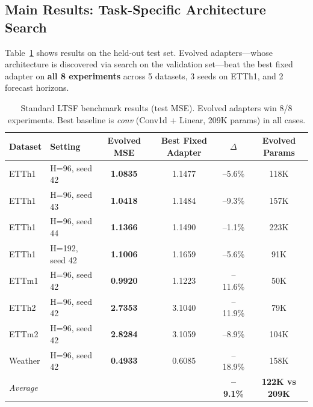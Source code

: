 \documentclass{article}
\begin{document}
\subsection{Main Results: Task-Specific Architecture Search}

Table~\ref{tab:main} shows results on the held-out test set. Evolved adapters---whose architecture is discovered via search on the validation set---beat the best fixed adapter on \textbf{all 8 experiments} across 5 datasets, 3 seeds on ETTh1, and 2 forecast horizons.

\begin{table}[h]
\centering
\caption{Standard LTSF benchmark results (test MSE). Evolved adapters win 8/8 experiments. Best baseline is \textit{conv} (Conv1d + Linear, 209K params) in all cases.}
\label{tab:main}
\begin{tabular}{@{}llcccc@{}}
\toprule
Dataset & Setting & Evolved MSE & Best Fixed Adapter & $\Delta$ & Evolved Params \\
\midrule
ETTh1 & H=96, seed 42 & \textbf{1.0835} & 1.1477 & --5.6\% & 118K \\
ETTh1 & H=96, seed 43 & \textbf{1.0418} & 1.1484 & --9.3\% & 157K \\
ETTh1 & H=96, seed 44 & \textbf{1.1366} & 1.1490 & --1.1\% & 223K \\
ETTh1 & H=192, seed 42 & \textbf{1.1006} & 1.1659 & --5.6\% & 91K \\
ETTm1 & H=96, seed 42 & \textbf{0.9920} & 1.1223 & --11.6\% & 50K \\
ETTh2 & H=96, seed 42 & \textbf{2.7353} & 3.1040 & --11.9\% & 79K \\
ETTm2 & H=96, seed 42 & \textbf{2.8284} & 3.1059 & --8.9\% & 104K \\
Weather & H=96, seed 42 & \textbf{0.4933} & 0.6085 & --18.9\% & 158K \\
\midrule
\multicolumn{2}{l}{\textit{Average}} & & & \textbf{--9.1\%} & \textbf{122K vs 209K} \\
\bottomrule
\end{tabular}
\end{table}
\end{document}
